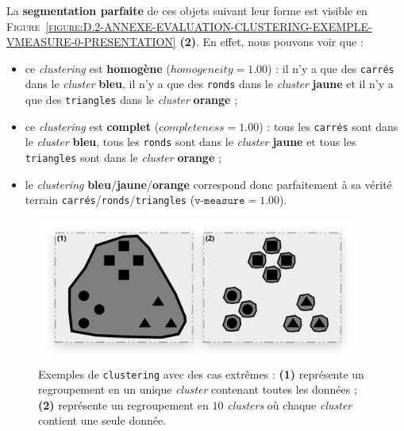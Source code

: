 		La \textbf{segmentation parfaite} de ces objets suivant leur forme est visible en \textsc{Figure~\ref{figure:D.2-ANNEXE-EVALUATION-CLUSTERING-EXEMPLE-VMEASURE-0-PRESENTATION}} \textbf{(2)}.
		En effet, nous pouvons voir que :
		\begin{itemize}
			\item ce \textit{clustering} est \textbf{homogène} ($homogeneity=1.00$) : il n'y a que des \texttt{carrés} dans le \textit{cluster} \textbf{\textcolor{colorSilverLakeBlue}{bleu}}, il n'y a que des \texttt{ronds} dans le \textit{cluster} \textbf{\textcolor{colorMinionYellow}{jaune}} et il n'y a que des \texttt{triangles} dans le \textit{cluster} \textbf{\textcolor{colorCarrotOrange}{orange}} ;
			\item ce \textit{clustering} est \textbf{complet} ($completeness=1.00$) : tous les \texttt{carrés} sont dans le \textit{cluster} \textbf{\textcolor{colorSilverLakeBlue}{bleu}}, tous les \texttt{ronds} sont dans le \textit{cluster} \textbf{\textcolor{colorMinionYellow}{jaune}} et tous les \texttt{triangles} sont dans le \textit{cluster} \textbf{\textcolor{colorCarrotOrange}{orange}} ;
			\item le \textit{clustering} \textbf{\textcolor{colorSilverLakeBlue}{bleu}}/\textbf{\textcolor{colorMinionYellow}{jaune}}/\textbf{\textcolor{colorCarrotOrange}{orange}} correspond donc parfaitement à sa vérité terrain \texttt{carrés}/\texttt{ronds}/\texttt{triangles} ($\texttt{v-measure}=1.00$).
		\end{itemize}
	
		\newpage
		\begin{figure}[H]
			\centering
			\includegraphics[width=0.95\textwidth]{figures/annexe-vmeasure-cas-extremes}
			\caption{
				Exemples de \texttt{clustering} avec des cas extrêmes :
				\textbf{(1)} représente un regroupement en un unique \textit{cluster} contenant toutes les données ;
				\textbf{(2)} représente un regroupement en $10$ \textit{clusters} où chaque \textit{cluster} contient une seule donnée.
			}
			\label{figure:D.2-ANNEXE-EVALUATION-CLUSTERING-EXEMPLE-VMEASURE-1-CAS-EXTREME}
		\end{figure}
		

